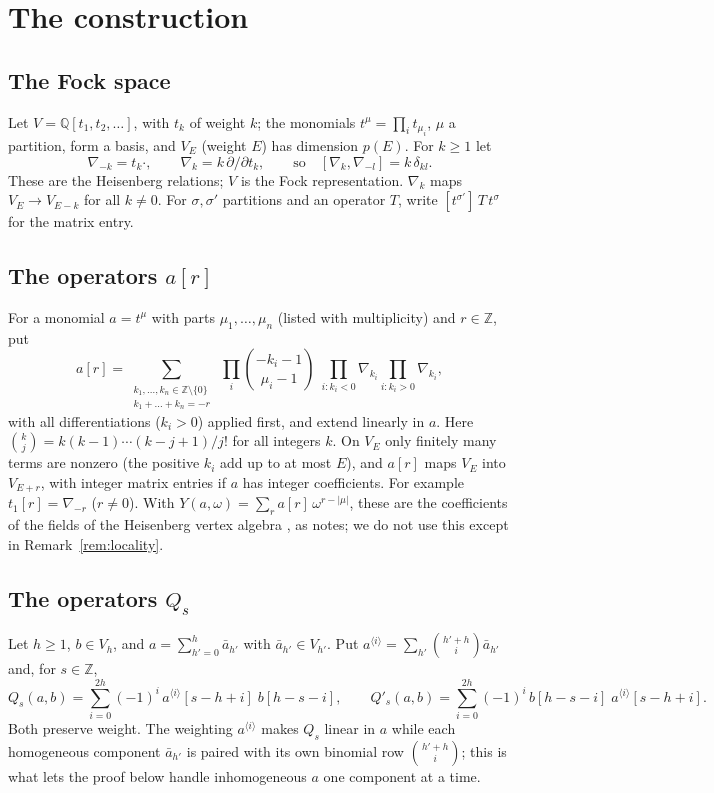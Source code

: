 \documentclass[11pt]{amsart}
\theoremstyle{remark}
\newcommand{\Q}{\mathbb{Q}}
\newcommand{\Z}{\mathbb{Z}}
\begin{document}
\section{The construction}\label{sec:construction}

\subsection{The Fock space}
Let $V=\Q[t_1,t_2,\dots]$, with $t_k$ of weight $k$; the monomials $t^\mu=\prod_it_{\mu_i}$, $\mu$ a partition,
form a basis, and $V_E$ (weight $E$) has dimension $p(E)$. For $k\ge1$ let
\[\nabla_{-k}=t_k\cdot,\qquad \nabla_k=k\,\partial/\partial t_k,\qquad\text{so}\quad[\nabla_k,\nabla_{-l}]=k\,\delta_{kl}.\]
These are the Heisenberg relations; $V$ is the Fock representation. $\nabla_k$ maps $V_E\to V_{E-k}$ for all $k\ne0$.
For $\sigma,\sigma'$ partitions and an operator $T$, write $[t^{\sigma'}]\,T\,t^\sigma$ for the matrix entry.

\subsection{The operators $a[r]$}
For a monomial $a=t^\mu$ with parts $\mu_1,\dots,\mu_n$ (listed with multiplicity) and $r\in\Z$, put
\begin{equation}\tag{47}
a[r]=\sum_{\substack{k_1,\dots,k_n\in\Z\setminus\{0\}\\ k_1+\dots+k_n=-r}}\;\prod_i\binom{-k_i-1}{\mu_i-1}\;
\prod_{i:k_i<0}\nabla_{k_i}\prod_{i:k_i>0}\nabla_{k_i},
\end{equation}
with all differentiations ($k_i>0$) applied first, and extend linearly in $a$. Here
$\binom{k}{j}=k(k-1)\cdots(k-j+1)/j!$ for all integers $k$. On $V_E$ only finitely many terms are nonzero (the
positive $k_i$ add up to at most $E$), and $a[r]$ maps $V_E$ into $V_{E+r}$, with integer matrix entries if $a$ has
integer coefficients. For example $t_1[r]=\nabla_{-r}$ ($r\neq0$). With $Y(a,\omega)=\sum_ra[r]\,\omega^{r-|\mu|}$, these are the
coefficients of the fields of the Heisenberg vertex algebra \cite[\S2.3, (4)]{Fre}, as \cite[App.~H]{ETH} notes; we do
not use this except in Remark~\ref{rem:locality}.

\subsection{The operators $Q_s$}
Let $h\ge1$, $b\in V_h$, and $a=\sum_{h'=0}^h\bar a_{h'}$ with $\bar a_{h'}\in V_{h'}$. Put
$a^{\langle i\rangle}=\sum_{h'}\binom{h'+h}{i}\bar a_{h'}$ and, for $s\in\Z$,
\begin{equation}\tag{48}
Q_s(a,b)=\sum_{i=0}^{2h}(-1)^i\,a^{\langle i\rangle}[s-h+i]\;b[h-s-i],\qquad
Q'_s(a,b)=\sum_{i=0}^{2h}(-1)^i\,b[h-s-i]\;a^{\langle i\rangle}[s-h+i].
\end{equation}
Both preserve weight. The weighting $a^{\langle i\rangle}$ makes $Q_s$ linear in $a$ while each homogeneous component
$\bar a_{h'}$ is paired with its own binomial row $\binom{h'+h}{i}$; this is what lets the proof below handle
inhomogeneous $a$ one component at a time.
\end{document}
